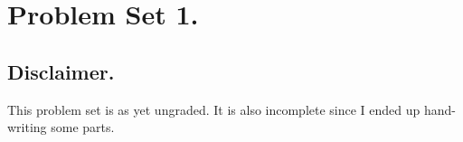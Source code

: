 %

\chapter{Problem Set 1.}
\label{chap:relElectroDynProblemSet1}
\date{Jan 22, 2011}

\beginArtNoToc

\section{Disclaimer.}

This problem set is as yet ungraded.  It is also incomplete since I ended up hand-writing some parts.

%
%
%


